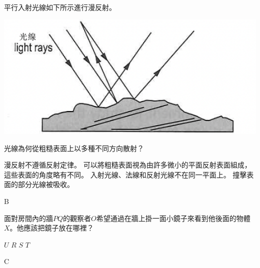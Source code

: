 {
    平行入射光線如下所示進行漫反射。
    \par{\par\centering\includegraphics[width=.4\textwidth]{./img/ch1prob_2024-05-18-15-19-42.png}\par}
    光線為何從粗糙表面上以多種不同方向散射？
    \begin{tasks}
        \task 漫反射不遵循反射定律。
        \task 可以將粗糙表面視為由許多微小的平面反射表面組成，這些表面的角度略有不同。
        \task 入射光線、法線和反射光線不在同一平面上。
        \task 撞擊表面的部分光線被吸收。
    \end{tasks}

}{\mckey B}

{
    面對房間內的牆$PQ$的觀察者$O$希望通過在牆上掛一面小鏡子來看到他後面的物體$X$。他應該把鏡子放在哪裡？
    \begin{tasks}
        \task $U$
        \task $R$
        \task $S$
        \task $T$
    \end{tasks}

}{\mckey C}

